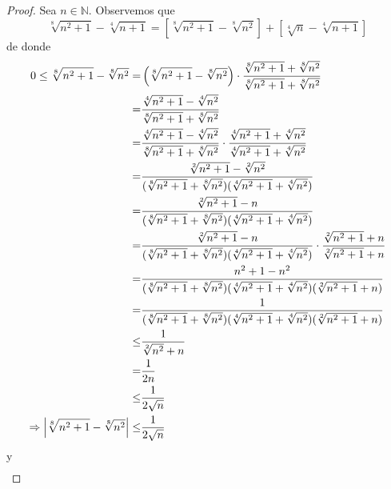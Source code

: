 \documentclass[12pt]{article}
\begin{document}
\begin{enumerate}
        \begin{proof}
            Sea $n\in\mathbb{N}$. Observemos que
            \begin{equation*}
                \sqrt[8]{n^2+1}-\sqrt[4]{n+1}=\left[\sqrt[8]{n^2+1}-\sqrt[8]{n^2}\right]+\left[\sqrt[4]{n}-\sqrt[4]{n+1}\right]
            \end{equation*}
            de donde
            \begin{equation*}
                \begin{split}
                    0\leq\sqrt[8]{n^2+1}-\sqrt[8]{n^2}=&\left(\sqrt[8]{n^2+1}-\sqrt[8]{n^2}\right)\cdot\frac{\sqrt[8]{n^2+1}+\sqrt[8]{n^2}}{\sqrt[8]{n^2+1}+\sqrt[8]{n^2}}\\
                    =&\frac{\sqrt[4]{n^2+1}-\sqrt[4]{n^2}}{\sqrt[8]{n^2+1}+\sqrt[8]{n^2}}\\
                    =&\frac{\sqrt[4]{n^2+1}-\sqrt[4]{n^2}}{\sqrt[8]{n^2+1}+\sqrt[8]{n^2}}\cdot\frac{\sqrt[4]{n^2+1}+\sqrt[4]{n^2}}{\sqrt[4]{n^2+1}+\sqrt[4]{n^2}}\\
                    =&\frac{\sqrt[2]{n^2+1}-\sqrt[2]{n^2}}{(\sqrt[8]{n^2+1}+\sqrt[8]{n^2})(\sqrt[4]{n^2+1}+\sqrt[4]{n^2})}\\
                    =&\frac{\sqrt[2]{n^2+1}-n}{(\sqrt[8]{n^2+1}+\sqrt[8]{n^2})(\sqrt[4]{n^2+1}+\sqrt[4]{n^2})}\\
                    =&\frac{\sqrt[2]{n^2+1}-n}{(\sqrt[8]{n^2+1}+\sqrt[8]{n^2})(\sqrt[4]{n^2+1}+\sqrt[4]{n^2})}\cdot\frac{\sqrt[2]{n^2+1}+n}{\sqrt[2]{n^2+1}+n}\\
                    =&\frac{n^2+1-n^2}{(\sqrt[8]{n^2+1}+\sqrt[8]{n^2})(\sqrt[4]{n^2+1}+\sqrt[4]{n^2})(\sqrt[2]{n^2+1}+n)}\\
                    =&\frac{1}{(\sqrt[8]{n^2+1}+\sqrt[8]{n^2})(\sqrt[4]{n^2+1}+\sqrt[4]{n^2})(\sqrt[2]{n^2+1}+n)}\\
                    \leq&\frac{1}{\sqrt[2]{n^2}+n}\\
                    =&\frac{1}{2n}\\
                    \leq&\frac{1}{2\sqrt{n}}\\
                    \Rightarrow \left| \sqrt[8]{n^2+1}-\sqrt[8]{n^2} \right|\leq&\frac{1}{2\sqrt{n}}\\
                \end{split}
            \end{equation*}
            y
            \begin{equation*}
                \begin{split}

\end{split}
\end{equation*}
\end{proof}
\end{enumerate}
\end{document}
